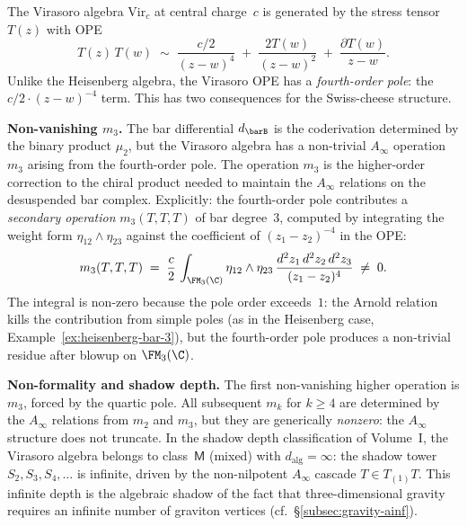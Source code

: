 \begin{example}
\label{ex:virasoro-SC}

The Virasoro algebra $\mathrm{Vir}_c$ at central charge~$c$ is
generated by the stress tensor $T(z)$ with OPE
\begin{equation}\label{eq:virasoro-OPE}
 T(z)\, T(w)
 \;\sim\;
 \frac{c/2}{(z-w)^4}
 \;+\;
 \frac{2T(w)}{(z-w)^2}
 \;+\;
 \frac{\partial T(w)}{z-w}.
\end{equation}
Unlike the Heisenberg algebra, the Virasoro OPE has a
\emph{fourth-order pole}: the $c/2 \cdot (z-w)^{-4}$ term. This
has two consequences for the Swiss-cheese structure.

\smallskip\noindent
\textbf{Non-vanishing $m_3$.}
The bar differential $d_{\barB}$ is the coderivation determined by
the binary product $\mu_2$, but the Virasoro algebra has a
non-trivial $A_\infty$ operation $m_3$ arising from the fourth-order
pole. The operation $m_3$ is the higher-order correction to the
chiral product needed to maintain the $A_\infty$ relations on the
desuspended bar complex. Explicitly:
the fourth-order pole contributes a \emph{secondary operation}
$m_3(T, T, T)$ of bar degree~$3$, computed by integrating the weight
form $\eta_{12}\wedge\eta_{23}$ against the coefficient of
$(z_1-z_2)^{-4}$ in the OPE:
\begin{equation}\label{eq:virasoro-m3}
 m_3(T, T, T)
 \;=\;
 \frac{c}{2}\,
 \int_{\FM_3(\C)}
 \eta_{12} \wedge \eta_{23}\,
 \frac{d^2z_1\, d^2z_2\, d^2z_3}{(z_1-z_2)^4}
 \;\neq\; 0.
\end{equation}
The integral is non-zero because the pole order exceeds~$1$: the
Arnold relation kills the contribution from simple poles (as in
the Heisenberg case, Example~\ref{ex:heisenberg-bar-3}), but the
fourth-order pole produces a non-trivial residue after blowup on
$\FM_3(\C)$.

\smallskip\noindent
\textbf{Non-formality and shadow depth.}
The first non-vanishing higher operation
is $m_3$, forced by the quartic pole. All subsequent $m_k$ for
$k \geq 4$ are determined by the $A_\infty$ relations from $m_2$
and $m_3$, but they are generically \emph{nonzero}: the $A_\infty$
structure does not truncate. In the shadow depth classification of
Volume~I, the Virasoro algebra belongs to class~$\mathsf{M}$
(mixed) with $d_{\mathrm{alg}} = \infty$: the shadow tower
$S_2, S_3, S_4, \ldots$ is infinite, driven by the non-nilpotent
$A_\infty$ cascade $T \in T_{(1)}T$. This infinite depth is the
algebraic shadow of the fact that three-dimensional gravity requires
an infinite number of graviton vertices (cf.\
\S\ref{subsec:gravity-ainf}).


\end{example}
